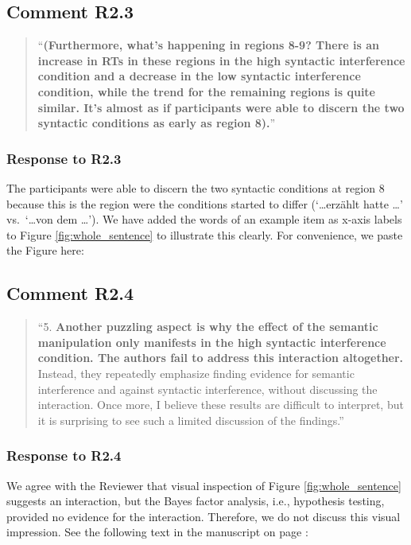 \documentclass[12pt]{article}
\begin{document}
\subsection*{Comment R2.3}
\begin{quote}
``\textbf{(Furthermore, what's happening in regions 8-9? There is an increase in RTs in these regions in the high syntactic interference condition and a decrease in the low syntactic interference condition, while the trend for the remaining regions is quite similar. It's almost as if participants were able to discern the two syntactic conditions as early as region 8).}''
\end{quote}

\subsubsection*{Response to R2.3}
The participants were able to discern the two syntactic conditions at region 8 because this is the region were the conditions started to differ (`\dots erzählt hatte \dots' vs.\ `\dots von dem \dots'). We have added the words of an example item as x-axis labels to Figure \ref{fig:whole_sentence} to illustrate this clearly. For convenience, we paste the Figure here:

\setcounter{figure}{2}


\newpage

\subsection*{Comment R2.4}
\begin{quote}
``5. \textbf{Another puzzling aspect is why the effect of the semantic manipulation only manifests in the high syntactic interference condition. The authors fail to address this interaction altogether.} Instead, they repeatedly emphasize finding evidence for semantic interference and against syntactic interference, without discussing the interaction. Once more, I believe these results are difficult to interpret, but it is surprising to see such a limited discussion of the findings.''
\end{quote}

\subsubsection*{Response to R2.4}
We agree with the Reviewer that visual inspection of Figure \ref{fig:whole_sentence} suggests an interaction, but the Bayes factor analysis, i.e., hypothesis testing, provided no evidence for the interaction. Therefore, we do not discuss this visual impression. See the following text in the manuscript on page \pageref{insig_interaction}:
\end{document}
